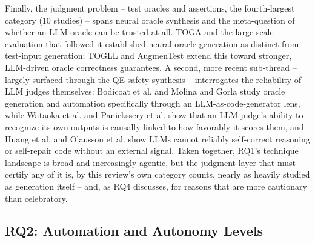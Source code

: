 Finally, the judgment problem -- test oracles and assertions, the
fourth-largest category (10 studies) -- spans neural oracle synthesis
and the meta-question of whether an LLM oracle can be trusted at all.
TOGA \cite{dinella2022} and the large-scale evaluation that followed
it \cite{hossain2023} established neural oracle generation as
distinct from test-input generation; TOGLL \cite{o32024} and
AugmenTest \cite{o42025} extend this toward stronger, LLM-driven
oracle correctness guarantees. A second, more recent sub-thread --
largely surfaced through the QE-safety synthesis -- interrogates the
reliability of LLM judges themselves: Bodicoat et al.
\cite{bodicoat2026oracle} and Molina and Gorla
\cite{molina2024oracleautomation} study oracle generation and
automation specifically through an LLM-as-code-generator lens, while
Wataoka et al. \cite{wataoka2024selfpreference} and Panickssery et
al. \cite{panickssery2024evaluators} show that an LLM judge's ability
to recognize its own outputs is causally linked to how favorably it
scores them, and Huang et al. \cite{huang2023selfcorrect} and Olausson
et al. \cite{olausson2023selfrepair} show LLMs cannot reliably
self-correct reasoning or self-repair code without an external
signal. Taken together, RQ1's technique landscape is broad and
increasingly agentic, but the judgment layer that must certify any of
it is, by this review's own category counts, nearly as heavily
studied as generation itself -- and, as RQ4 discusses, for reasons
that are more cautionary than celebratory.

\subsection{RQ2: Automation and Autonomy Levels}
\label{subsec:rq2-autonomy}


